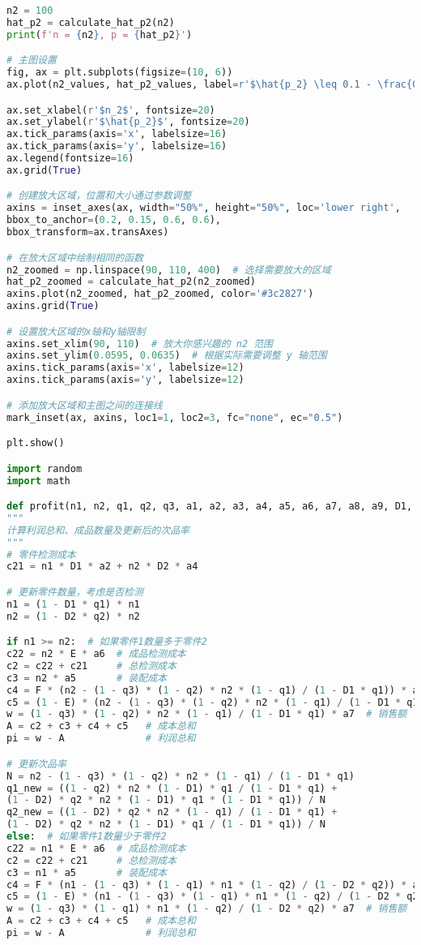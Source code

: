 \documentclass[withoutpreface,bwprint]{cumcmthesis} %
\begin{document}
\begin{lstlisting}[language=python]
n2 = 100
hat_p2 = calculate_hat_p2(n2)
print(f'n = {n2}, p = {hat_p2}')

# 主图设置
fig, ax = plt.subplots(figsize=(10, 6))
ax.plot(n2_values, hat_p2_values, label=r'$\hat{p_2} \leq 0.1 - \frac{0.3846}{\sqrt{n_2}}$', color='#3c2827')

ax.set_xlabel(r'$n_2$', fontsize=20)
ax.set_ylabel(r'$\hat{p_2}$', fontsize=20)
ax.tick_params(axis='x', labelsize=16)
ax.tick_params(axis='y', labelsize=16)
ax.legend(fontsize=16)
ax.grid(True)

# 创建放大区域，位置和大小通过参数调整
axins = inset_axes(ax, width="50%", height="50%", loc='lower right',
bbox_to_anchor=(0.2, 0.15, 0.6, 0.6),
bbox_transform=ax.transAxes)

# 在放大区域中绘制相同的函数
n2_zoomed = np.linspace(90, 110, 400)  # 选择需要放大的区域
hat_p2_zoomed = calculate_hat_p2(n2_zoomed)
axins.plot(n2_zoomed, hat_p2_zoomed, color='#3c2827')
axins.grid(True)

# 设置放大区域的x轴和y轴限制
axins.set_xlim(90, 110)  # 放大你感兴趣的 n2 范围
axins.set_ylim(0.0595, 0.0635)  # 根据实际需要调整 y 轴范围
axins.tick_params(axis='x', labelsize=12)
axins.tick_params(axis='y', labelsize=12)

# 添加放大区域和主图之间的连接线
mark_inset(ax, axins, loc1=1, loc2=3, fc="none", ec="0.5")

plt.show()

import random
import math

def profit(n1, n2, q1, q2, q3, a1, a2, a3, a4, a5, a6, a7, a8, a9, D1, D2, E, F):
"""
计算利润总和、成品数量及更新后的次品率
"""
# 零件检测成本
c21 = n1 * D1 * a2 + n2 * D2 * a4

# 更新零件数量，考虑是否检测
n1 = (1 - D1 * q1) * n1
n2 = (1 - D2 * q2) * n2

if n1 >= n2:  # 如果零件1数量多于零件2
c22 = n2 * E * a6  # 成品检测成本
c2 = c22 + c21     # 总检测成本
c3 = n2 * a5       # 装配成本
c4 = F * (n2 - (1 - q3) * (1 - q2) * n2 * (1 - q1) / (1 - D1 * q1)) * a9  # 拆解费用
c5 = (1 - E) * (n2 - (1 - q3) * (1 - q2) * n2 * (1 - q1) / (1 - D1 * q1)) * a8  # 调换成本
w = (1 - q3) * (1 - q2) * n2 * (1 - q1) / (1 - D1 * q1) * a7  # 销售额
A = c2 + c3 + c4 + c5   # 成本总和
pi = w - A              # 利润总和

# 更新次品率
N = n2 - (1 - q3) * (1 - q2) * n2 * (1 - q1) / (1 - D1 * q1)
q1_new = ((1 - q2) * n2 * (1 - D1) * q1 / (1 - D1 * q1) +
(1 - D2) * q2 * n2 * (1 - D1) * q1 * (1 - D1 * q1)) / N
q2_new = ((1 - D2) * q2 * n2 * (1 - q1) / (1 - D1 * q1) +
(1 - D2) * q2 * n2 * (1 - D1) * q1 / (1 - D1 * q1)) / N
else:  # 如果零件1数量少于零件2
c22 = n1 * E * a6  # 成品检测成本
c2 = c22 + c21     # 总检测成本
c3 = n1 * a5       # 装配成本
c4 = F * (n1 - (1 - q3) * (1 - q1) * n1 * (1 - q2) / (1 - D2 * q2)) * a9  # 拆解费用
c5 = (1 - E) * (n1 - (1 - q3) * (1 - q1) * n1 * (1 - q2) / (1 - D2 * q2)) * a8  # 调换成本
w = (1 - q3) * (1 - q1) * n1 * (1 - q2) / (1 - D2 * q2) * a7  # 销售额
A = c2 + c3 + c4 + c5   # 成本总和
pi = w - A              # 利润总和


\end{lstlisting}
\end{document}
